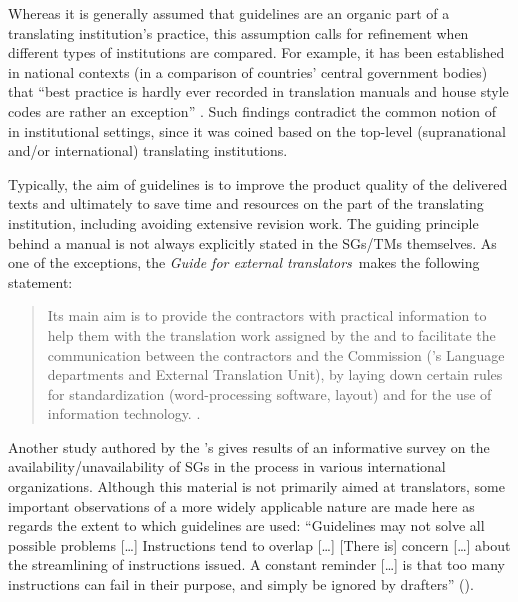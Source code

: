 \documentclass[output=paper]{langsci/langscibook}
\begin{document}
Whereas it is generally assumed that guidelines are an organic part of a translating institution’s practice, this assumption calls for refinement when different types of institutions are compared. For example, it has been established in national contexts (in a comparison of  countries’ central government bodies) that “best practice is hardly ever recorded in translation manuals and house style codes are rather an exception” \citep{Svoboda2017forthcoming}. Such findings contradict the common notion of  in institutional settings, since it was coined based on the top-level (supranational and/or international) translating institutions.

Typically, the aim of guidelines is to improve the product quality of the delivered texts and ultimately to save time and resources on the part of the translating institution, including avoiding extensive revision work. The guiding principle behind a manual is not always explicitly stated in the SGs/TMs themselves. As one of the exceptions, the  \textit{Guide for external translators}~makes the following statement:

\begin{quote}
Its main aim is to provide the contractors with practical information to help them with the translation work assigned by the  and to facilitate the communication between the contractors and the Commission (’s Language departments and External Translation Unit), by laying down certain rules for standardization (word-processing software, layout) and for the use of information technology. \citep[4]{DGT2008}.
\end{quote}

Another study authored by the ’s \citet[175–186]{DGT2013} gives results of an informative survey on the availability/unavailability of SGs in the  process in various international organizations. Although this material is not primarily aimed at translators, some important observations of a more widely applicable nature are made here as regards the extent to which guidelines are used: “Guidelines may not solve all possible problems […] Instructions tend to overlap […] [There is] concern […] about the streamlining of instructions issued. A constant reminder […] is that too many instructions can fail in their purpose, and simply be ignored by drafters” (\citeyear[175]{DGT2013}).
\end{document}
